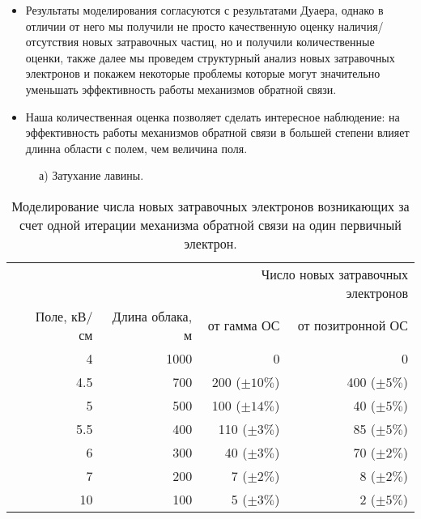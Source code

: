 \begin{itemize}
	\item Результаты моделирования согласуются с результатами Дуаера, однако в отличии от него мы получили не просто качественную оценку наличия/отсутствия новых затравочных частиц, но и получили количественные оценки, также далее мы проведем структурный анализ новых затравочных электронов и покажем некоторые проблемы которые могут значительно уменьшать эффективность работы механизмов обратной связи.
	\item Наша количественная оценка позволяет сделать интересное наблюдение: на эффективность работы механизмов обратной связи в большей степени влияет длинна области с полем, чем величина поля. %
\end{itemize}

\begin{figure}[t]
    \begin{center}
        \begin{minipage}[h]{0.49\linewidth}
        \end{minipage}
        \hfill
        \begin{minipage}[h]{0.49\linewidth}
        \end{minipage}
        \caption{а) Затухание лавины.}
    \end{center}
    \label{fig:storm:dwyer2003}
\end{figure}

\begin{table}[h]
    \centering
    \begin{tabular}{crrrr}
        \hline
        & & & \multicolumn{2}{r}{Число новых затравочных электронов} \\
        & Поле, кВ/см &  Длина облака, м  & от гамма ОС & от позитронной ОС \\
        \hline
        & 4   &  1000&  0 & 0  \\
        & 4.5 &  700 &  200 ($\pm 10 \%$)& 400 ($\pm 5 \%$) \\
        & 5   &  500 &  100 ($\pm 14 \%$)& 40 ($\pm 5 \%$) \\
        & 5.5 &  400 &  110 ($\pm 3 \%$)& 85 ($\pm 5 \%$) \\
        & 6   &  300 &  40 ($\pm 3 \%$)& 70 ($\pm 2 \%$) \\
        & 7   &  200 &  7 ($\pm 2 \%$)& 8 ($\pm 2 \%$) \\
        & 10  &  100 &  5 ($\pm 3 \%$)& 2 ($\pm 5 \%$) \\
        \hline
    \end{tabular}
    \caption{Моделирование числа новых затравочных электронов возникающих за счет одной итерации механизма обратной связи на один первичный электрон.}
    \label{tab:storm:dwyer}
\end{table}

